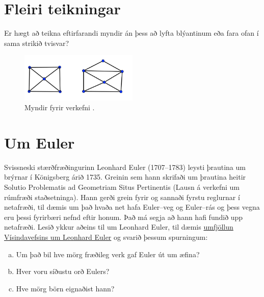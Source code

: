 \documentclass[b5paper,12pt]{book}
\renewcommand*\thesection{\arabic{section}}
\begin{document}
\section{Fleiri teikningar}
Er hægt að teikna eftirfarandi myndir án þess að lyfta blýantinum eða fara ofan í sama strikið tvisvar?

\begin{figure}[h]
  \includegraphics[width=0.5\textwidth, center]{Eulerspurning3.png}
  \caption*{Myndir fyrir verkefni \thesection{}.}
\end{figure}

\section{Um Euler}
Svissneski stærðfræðingurinn Leonhard Euler (1707–1783) leysti þrautina um brýrnar í Königsberg árið 1735. Greinin sem hann skrifaði um þrautina heitir Solutio Problematis ad Geometriam Situs Pertinentis (Lausn á verkefni um rúmfræði staðsetninga). Hann gerði grein fyrir og sannaði fyrstu reglurnar í netafræði, til dæmis um það hvaða net hafa Euler--veg og Euler--rás og þess vegna eru þessi fyrirbæri nefnd eftir honum. Það má segja að hann hafi fundið upp netafræði. Lesið ykkur aðeins til um Leonhard Euler, til dæmis \href {http://www.visindavefur.is/svar.php?id=60127} {umfjöllun Vísindavefsins um Leonhard Euler} og svarið þessum spurningum:
\begin{enumerate}[(a)]
    \item Um það bil hve mörg fræðileg verk gaf Euler út um æfina? 
    \item Hver voru síðustu orð Eulers?
    \item Hve mörg börn eignaðist hann?
\end{enumerate}
\end{document}

